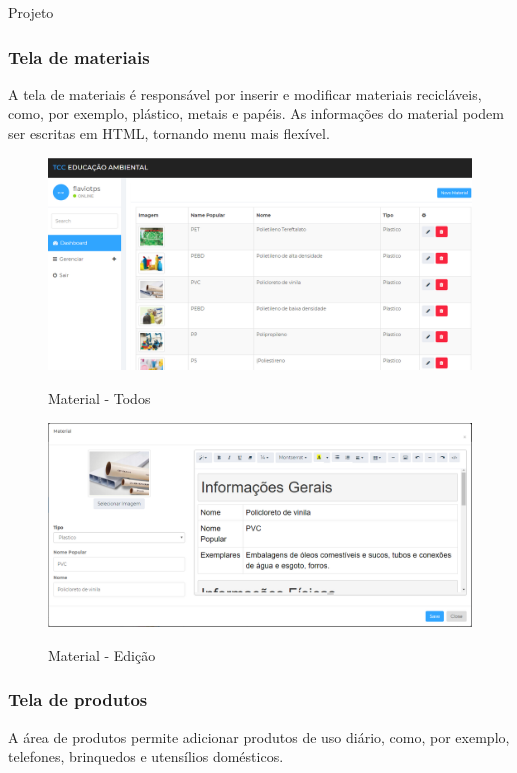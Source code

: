 \documentclass[
	12pt,				%
	openany,			%
	twoside,			%
	a4paper,			%
	english,			%
	french,				%
	spanish,			%
	brazil				%
	]{abntex2}
\begin{document}
\begin{chapter}{Projeto}
\subsubsection{Tela de materiais} \label{tela_material}
A tela de materiais é responsável por inserir e modificar materiais recicláveis, como, por exemplo, plástico, metais e papéis. As informações do material podem ser escritas em HTML, tornando menu mais flexível.
\begin{figure}[h]
\centering
   \caption{Material - Todos}
   \includegraphics[scale=0.45]{media/tela_material_site_1.png}
     \label{fig:tela_material_site_1}
\end{figure}

\begin{figure}[h]
\centering
   \caption{Material - Edição}
   \includegraphics[scale=0.40]{media/tela_material_site_2.png}
     \label{fig:tela_material_site_2}
\end{figure}

\newpage
\subsubsection{Tela de produtos} \label{tela_produtos}
A área de produtos permite adicionar produtos de uso diário, como, por exemplo, telefones, brinquedos e utensílios domésticos. 


\end{chapter}
\end{document}

